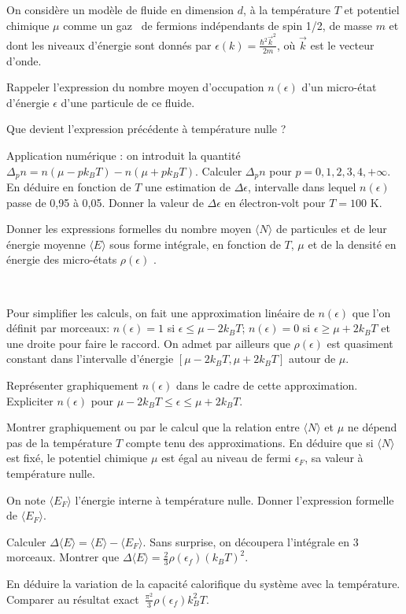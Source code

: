 On considère un modèle de fluide en dimension $d$, à la température $T$ et potentiel chimique $\mu$ comme un \og gaz \fg \ de fermions  indépendants de spin 1/2, de masse $m$ et dont les niveaux d'énergie  sont donnés par
$\epsilon (k)=\frac{\hbar^2 \vec{k}^2}{2m}$,
où $\vec k$ est le vecteur d'onde.

\question Rappeler l'expression du nombre moyen d'occupation $n(\epsilon)$ d'un micro-état d'énergie $\epsilon$ d'une particule de ce fluide.

\question Que devient l'expression précédente à température nulle ?

\question Application numérique : on introduit la quantité $\Delta_p n=n(\mu-p k_BT)-n(\mu+p k_BT)$. Calculer $\Delta_p n$ pour $p=0, 1, 2, 3, 4, +\infty$. En déduire en fonction de $T$ une estimation de $\Delta \epsilon$, intervalle dans lequel $n(\epsilon)$ passe de 0,95 à 0,05. Donner la valeur de $\Delta \epsilon$ en électron-volt pour $T=100$ K.

\question Donner les expressions formelles du nombre moyen $\langle N \rangle$ de particules et de leur énergie moyenne $\langle E \rangle$ sous forme intégrale, en fonction de $T$, $\mu$ et de la densité en énergie des micro-états $\rho (\epsilon)$ .

\ 

Pour simplifier les calculs, on fait une approximation linéaire de $n(\epsilon)$ que l'on définit par morceaux: $n(\epsilon)=1$ si $\epsilon \le \mu-2 k_BT$; $n(\epsilon)=0$ si $\epsilon \ge \mu+2 k_BT$ et une droite pour faire le raccord. On admet par ailleurs que  $\rho(\epsilon)$ est quasiment constant dans l'intervalle d'énergie $[\mu-2 k_BT, \mu+2 k_BT]$ autour de $\mu$.

\question Représenter graphiquement $n(\epsilon)$ dans le cadre de cette approximation. Expliciter $n(\epsilon)$ pour $\mu-2 k_BT \le \epsilon \le \mu+2 k_BT$.

\question Montrer graphiquement ou par le calcul que la relation entre $\langle N \rangle$ et $\mu$ ne dépend pas de la température $T$ compte tenu des approximations. En déduire que si $\langle N \rangle$ est fixé, le potentiel chimique $\mu$ est égal au niveau de fermi $\epsilon_F$, sa valeur à température nulle.

\question On note $\langle E_F \rangle$ l'énergie interne à température nulle. Donner l'expression formelle de $\langle E_F \rangle$.

\question Calculer $\Delta \langle E \rangle =  \langle E \rangle-\langle E_F \rangle .$ Sans surprise, on découpera l'intégrale  en 3 morceaux. Montrer que \mbox{$\Delta \langle E \rangle =\frac{2}{3} \rho(\epsilon_f) (k_BT)^2$}.

\question En déduire la variation de la capacité calorifique du système avec la température. Comparer au résultat \mbox{exact $\frac{\pi^2}{3} \rho(\epsilon_f) k_B^2 T$}.

